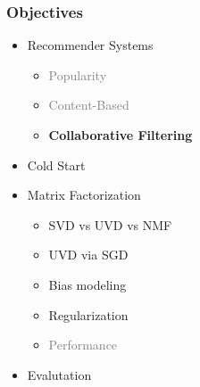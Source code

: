 \documentclass[xcolor={dvipsnames}]{beamer}
\begin{document}
\frame
{
\frametitle{Objectives}

\huge
\begin{itemize}
\item Recommender Systems
\begin{itemize}
\item \textcolor{gray}{Popularity}
\item \textcolor{gray}{Content-Based}
\item \textbf{Collaborative Filtering} 
\end{itemize}
\item Cold Start\\
\vspace{.5em}
\item Matrix Factorization
\begin{itemize}
\item SVD vs UVD vs NMF
\item UVD via SGD
\item Bias modeling
\item Regularization
\item \textcolor{gray}{Performance}
\end{itemize}
\item Evalutation
\end{itemize}


}
\end{document}
